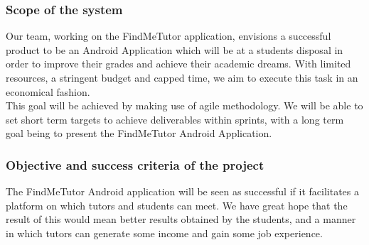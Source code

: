 \documentclass[12pt]{article}
\begin{document}
\subsubsection{Scope of the system}
\begin{flushleft}
Our team, working on the FindMeTutor application, envisions a successful product to be an Android Application which will be at a students disposal in order to improve their grades and achieve their academic dreams. With limited resources, a stringent budget and capped time, we aim to execute this task in an economical fashion.\\
This goal will be achieved by making use of agile methodology. We will be able to set short term targets to achieve deliverables within sprints, with a long term goal being to present the FindMeTutor Android Application. 
\end{flushleft}
\subsubsection{Objective and success criteria of the project}
\begin{flushleft}
The FindMeTutor Android application will be seen as successful if it facilitates a platform on which tutors and students can meet. We have great hope that the result of this would mean better results obtained by the students, and a manner in which tutors can generate some income and gain some job experience. 
\end{flushleft}
\end{document}
